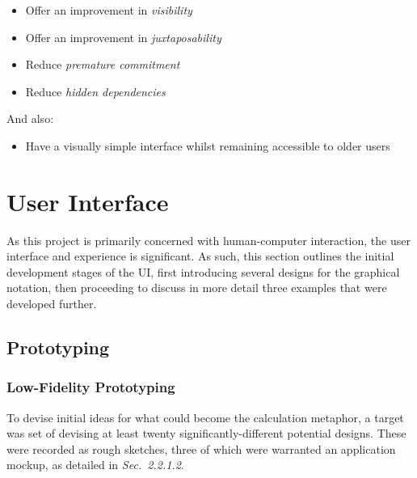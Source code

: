 \documentclass[12pt,twoside,notitlepage,xetex]{report}
\begin{document}
\begin{itemize}
\item Offer an improvement in \emph{visibility}
\item Offer an improvement in \emph{juxtaposability}
\item Reduce \emph{premature commitment}
\item Reduce \emph{hidden dependencies}
\end{itemize}

And also:

\begin{itemize}
\item Have a visually simple interface whilst remaining accessible to older users
\end{itemize}

\section{User Interface}

As this project is primarily concerned with human-computer interaction, the user interface and experience is significant.  As such, this section outlines the initial development stages of the UI, first introducing several designs for the graphical notation, then proceeding to discuss in more detail three examples that were developed further.

\subsection{Prototyping}

\subsubsection{Low-Fidelity Prototyping}

To devise initial ideas for what could become the calculation metaphor, a target was set of devising at least twenty significantly-different potential designs.  These were recorded as rough sketches, three of which were warranted an application mockup, as detailed in \emph{Sec.~2.2.1.2}.
\end{document}
